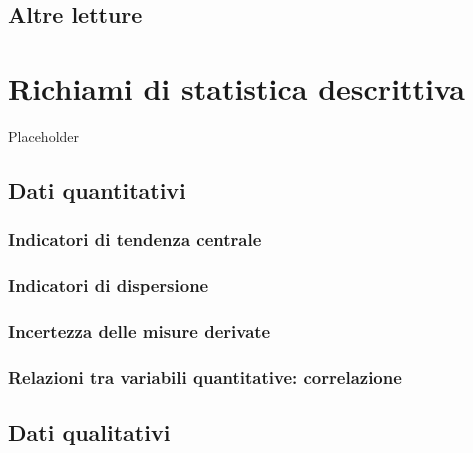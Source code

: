 \documentclass[a4paper,12pt,oneside]{book}
\begin{document}
\hypertarget{altre-letture-1}{%
\section{Altre letture}\label{altre-letture-1}}

\hypertarget{richiami-di-statistica-descrittiva}{%
\chapter{Richiami di statistica descrittiva}\label{richiami-di-statistica-descrittiva}}

Placeholder

\hypertarget{dati-quantitativi}{%
\section{Dati quantitativi}\label{dati-quantitativi}}

\hypertarget{indicatori-di-tendenza-centrale}{%
\subsection{Indicatori di tendenza centrale}\label{indicatori-di-tendenza-centrale}}

\hypertarget{indicatori-di-dispersione}{%
\subsection{Indicatori di dispersione}\label{indicatori-di-dispersione}}

\hypertarget{incertezza-delle-misure-derivate}{%
\subsection{Incertezza delle misure derivate}\label{incertezza-delle-misure-derivate}}

\hypertarget{relazioni-tra-variabili-quantitative-correlazione}{%
\subsection{Relazioni tra variabili quantitative: correlazione}\label{relazioni-tra-variabili-quantitative-correlazione}}

\hypertarget{dati-qualitativi}{%
\section{Dati qualitativi}\label{dati-qualitativi}}
\end{document}
